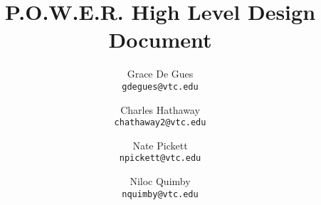 \documentclass[titlepage]{report}
\begin{document}
\title{P.O.W.E.R. High Level Design Document}
\author{
  Grace De Gues\\
  \texttt{gdegues@vtc.edu}
  \and
  Charles Hathaway\\
  \texttt{chathaway2@vtc.edu}
  \and
  Nate Pickett\\
  \texttt{npickett@vtc.edu}
  \and
  Niloc Quimby\\
  \texttt{nquimby@vtc.edu}
}
\maketitle

\tableofcontents






\end{document}
